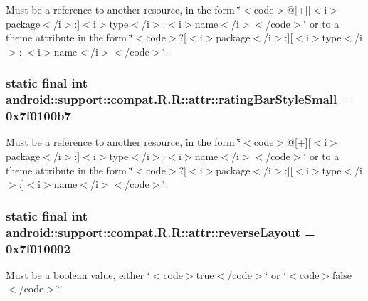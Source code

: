 Must be a reference to another resource, in the form \char`\"{}$<$code$>$@\mbox{[}+\mbox{]}\mbox{[}$<$i$>$package$<$/i$>$:\mbox{]}$<$i$>$type$<$/i$>$:$<$i$>$name$<$/i$>$$<$/code$>$\char`\"{} or to a theme attribute in the form \char`\"{}$<$code$>$?\mbox{[}$<$i$>$package$<$/i$>$:\mbox{]}\mbox{[}$<$i$>$type$<$/i$>$:\mbox{]}$<$i$>$name$<$/i$>$$<$/code$>$\char`\"{}. \hypertarget{classandroid_1_1support_1_1compat_1_1_r_1_1attr_85b66f3878b23e11fd7d8ca974d18c2f}{
\subsubsection[{ratingBarStyleSmall}]{\setlength{\rightskip}{0pt plus 5cm}static final int android::support::compat.R.R::attr::ratingBarStyleSmall = 0x7f0100b7}}
\label{classandroid_1_1support_1_1compat_1_1_r_1_1attr_85b66f3878b23e11fd7d8ca974d18c2f}


Must be a reference to another resource, in the form \char`\"{}$<$code$>$@\mbox{[}+\mbox{]}\mbox{[}$<$i$>$package$<$/i$>$:\mbox{]}$<$i$>$type$<$/i$>$:$<$i$>$name$<$/i$>$$<$/code$>$\char`\"{} or to a theme attribute in the form \char`\"{}$<$code$>$?\mbox{[}$<$i$>$package$<$/i$>$:\mbox{]}\mbox{[}$<$i$>$type$<$/i$>$:\mbox{]}$<$i$>$name$<$/i$>$$<$/code$>$\char`\"{}. \hypertarget{classandroid_1_1support_1_1compat_1_1_r_1_1attr_1a5778629b719bded3d8c09a62810b5e}{
\subsubsection[{reverseLayout}]{\setlength{\rightskip}{0pt plus 5cm}static final int android::support::compat.R.R::attr::reverseLayout = 0x7f010002}}
\label{classandroid_1_1support_1_1compat_1_1_r_1_1attr_1a5778629b719bded3d8c09a62810b5e}


Must be a boolean value, either \char`\"{}$<$code$>$true$<$/code$>$\char`\"{} or \char`\"{}$<$code$>$false$<$/code$>$\char`\"{}. 

